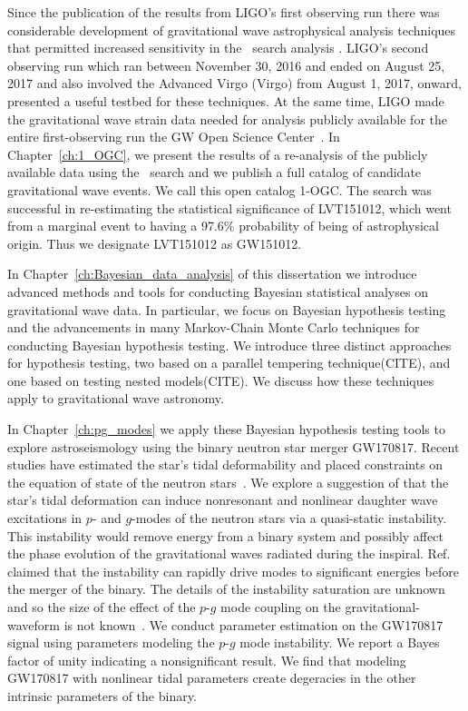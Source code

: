 Since the publication of the results from LIGO's first observing run there was considerable development of gravitational wave astrophysical analysis techniques that permitted increased sensitivity in the \pycbc{}\ search analysis \citep{Nitz:2017svb,Nitz:2017lco,DalCanton:2017ala}. LIGO's second observing run which ran between November 30, 2016 and ended on August 25, 2017 and also involved the Advanced Virgo (Virgo) from August 1, 2017, onward, presented a useful testbed for these techniques. At the same time, LIGO made the gravitational wave strain data needed for analysis publicly available for the entire first-observing run the GW Open Science Center~\citep{Vallisneri:2014vxa}. In Chapter~\ref{ch:1_OGC}, we present the results of a re-analysis of the publicly available data using the \pycbc{}\ search and we publish a full catalog of candidate gravitational wave events. We call this open catalog 1-OGC. The search was successful in re-estimating the statistical significance of LVT151012, which went from a marginal event to having a 97.6$\%$ probability of being of astrophysical origin. Thus we designate LVT151012 as GW151012. 


In Chapter~\ref{ch:Bayesian_data_analysis} of this dissertation we introduce advanced methods and tools for conducting Bayesian statistical analyses on gravitational wave data. In particular, we focus on Bayesian hypothesis testing and the advancements in many Markov-Chain Monte Carlo techniques for conducting Bayesian hypothesis testing. We introduce three distinct approaches for hypothesis testing, two based on a parallel tempering technique(CITE), and one based on testing nested models(CITE). We discuss how these techniques apply to gravitational wave astronomy. 

In Chapter~\ref{ch:pg_modes} we apply these Bayesian hypothesis testing tools to explore astroseismology using the binary neutron star merger GW170817. Recent studies have estimated the star's tidal deformability and placed constraints on the equation of state of the neutron stars~\citep{TheLIGOScientific:2017qsa,Tews:2018iwm,Most:2018eaw,Raithel:2018ncd,de2018tidal,Abbott:2018exr,Abbott:2018wiz,Radice:2018ozg,LIGOScientific:2019eut,Capano:2019eae}. We explore a suggestion of \cite{Weinberg:2013pbi} that the star's tidal deformation can induce nonresonant and nonlinear daughter wave excitations in $p$- and $g$-modes of the neutron stars via a quasi-static instability. This instability would remove energy from a binary system and possibly affect the phase evolution of the gravitational waves radiated during the inspiral. Ref. \cite{Weinberg:2015pxa} claimed that the instability can rapidly drive modes to significant energies before the merger of the binary. The details of the instability saturation are unknown and so the size of the effect of the $p$-$g$ mode coupling on the gravitational-waveform is not known~\citep{Weinberg:2015pxa}. We conduct parameter estimation on the GW170817 signal using parameters modeling the $p$-$g$ mode instability. We report a Bayes factor of unity indicating a nonsignificant result. We find that modeling GW170817 with nonlinear tidal parameters create degeracies in the other intrinsic parameters of the binary. 
